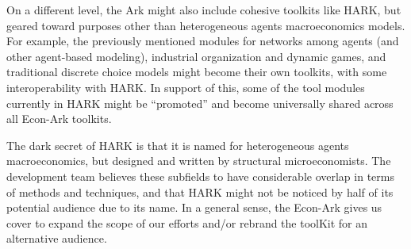 \documentclass[12pt,titlepage,letterpaper]{econtex}
\begin{document}
On a different level, the Ark might also include cohesive toolkits like HARK, but geared toward purposes other than heterogeneous agents macroeconomics models.  For example, the previously mentioned modules for networks among agents (and other agent-based modeling), industrial organization and dynamic games, and traditional discrete choice models might become their own toolkits, with some interoperability with HARK.  In support of this, some of the tool modules currently in HARK might be ``promoted'' and become universally shared across all Econ-Ark toolkits.

The dark secret of HARK is that it is named for heterogeneous agents macroeconomics, but designed and written by structural microeconomists.  The development team believes these subfields to have considerable overlap in terms of methods and techniques, and that HARK might not be noticed by half of its potential audience due to its name.  In a general sense, the Econ-Ark gives us cover to expand the scope of our efforts and/or rebrand the toolKit for an alternative audience.
\end{document}
